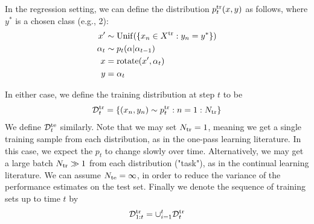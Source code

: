 In the regression setting, we can define the distribution 
$p_t^{\mathrm{tr}}(x,y)$ as follows,
where $y^*$ is a chosen class (e.g., 2):
\begin{align}
x' &\sim \mathrm{Unif}(\{ x_n \in X^{\mathrm{tr}}: y_n = y^* \}) \\
\alpha_t &\sim p_t(\alpha|\alpha_{t-1}) \\
x &= \text{rotate}(x', \alpha_t) \\
y &= \alpha_t
 \end{align}

In either case,
we define the training distribution at step $t$ to be
\begin{align}
{\mathcal{D}}_t^{\mathrm{tr}} = \{ (x_n,y_n) \sim p_t^{\mathrm{tr}}: n=1:N_{\mathrm{tr}} \}
\end{align}
We define ${\mathcal{D}}_t^{\text{te}}$ similarly.
Note that we may set $N_{\mathrm{tr}}=1$, meaning we get a single
training sample from each distribution,
as in the one-pass learning literature.
In this case, we expect the $p_t$ to change slowly over time.
Alternatively, we may get a large batch $N_{\mathrm{tr}} \gg 1$
from each distribution ("task"),
as in the continual learning literature.
We can assume $N_{\text{te}}=\infty$, in order to reduce the variance of the performance estimates on the test set.
Finally we denote the sequence of training sets up to time $t$
by 
\begin{align}
{\mathcal{D}}_{1:t}^{\mathrm{tr}} = \cup_{i=1}^t {\mathcal{D}}_t^{\mathrm{tr}}
\end{align}
